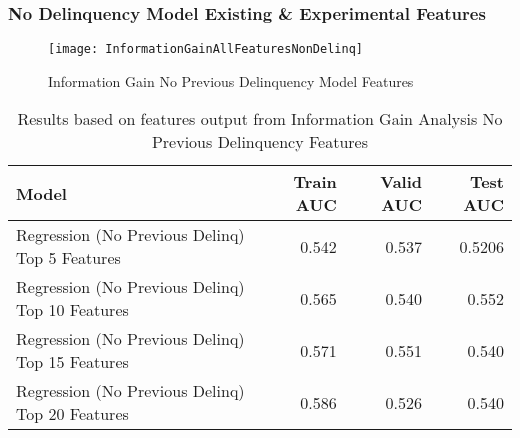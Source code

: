 \subsubsection{No Delinquency Model Existing \& Experimental Features}

\begin{figure}[H]
	\texttt{[image: InformationGainAllFeaturesNonDelinq]}
	\caption{Information Gain No Previous Delinquency Model Features}
	\label{fig:Information Gain No Previous Delinquency Model Features}
\end{figure}

\begin{table}[H]
	\centering
	\resizebox{\textwidth}{!}
	{
		\begin{tabular}{l | r | r| r}
			\hline
			\textbf{Model} & \textbf{Train AUC} & \textbf{Valid AUC} &  \textbf{Test AUC} \\
			\hline
			Regression (No Previous Delinq) Top 5 Features &  0.542 &  0.537 &  0.5206  \\
			Regression (No Previous Delinq) Top 10 Features &  0.565 &  0.540 &  0.552  \\			
			Regression (No Previous Delinq) Top 15 Features &  0.571 &  0.551 &  0.540  \\	
			Regression (No Previous Delinq) Top 20 Features &  0.586 &  0.526 &  0.540  \\		
						\hline
		\end{tabular}
	}
	\caption{Results based on features output from Information Gain Analysis No Previous Delinquency Features }
	\label{table:featureselection_base_model}
\end{table}

